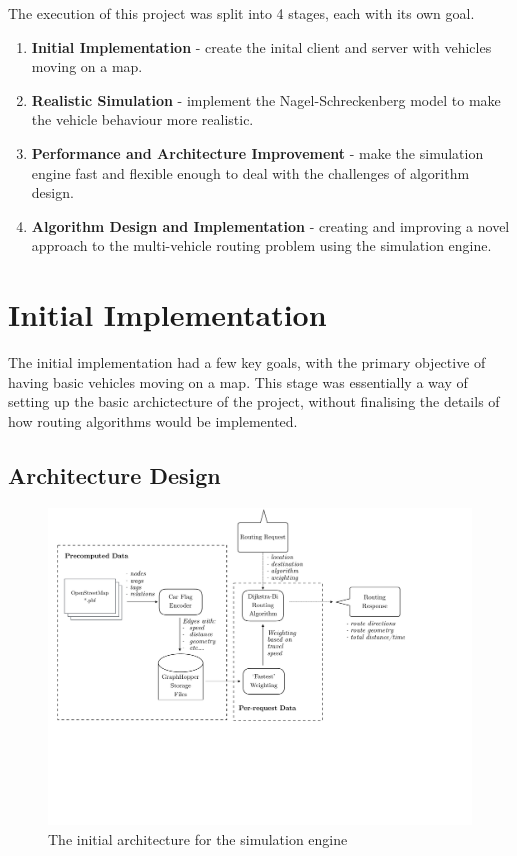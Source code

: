 \documentclass[ %
                    author={Alexander Hill},
                supervisor={Dr. Benjamin Sach},
                    degree={MEng},
                     title={MARMOSET: Multi Agent Real-time Multi-core Online
                     Simulation for Efficient Transportation},
                  subtitle={},
                      type={research},
                      year={2016} ]{dissertation}
\begin{document}
The execution of this project was split into 4 stages, each with its own goal.

\begin{enumerate}
    \item \textbf{Initial Implementation} - create the inital client and
        server with vehicles moving on a map.
    \item \textbf{Realistic Simulation} - implement the Nagel-Schreckenberg
        model to make the vehicle behaviour more realistic.
    \item \textbf{Performance and Architecture Improvement} - make the
        simulation engine fast and flexible enough to deal with the challenges
        of algorithm design.
    \item \textbf{Algorithm Design and Implementation} - creating and improving
        a novel approach to the multi-vehicle routing problem using the
        simulation engine.
\end{enumerate}

\section{Initial Implementation}

The initial implementation had a few key goals, with the primary objective of
having basic vehicles moving on a map. This stage was essentially a way of
setting up the basic archictecture of the project, without finalising the
details of how routing algorithms would be implemented.

\subsection{Architecture Design}

\begin{figure}[h]
    \centering
    \includegraphics[scale=0.5,page=2,clip,trim=0 17cm 3cm 0]{architecture}
    \caption{The initial architecture for the simulation engine}\label{fig:init-arch}
\end{figure}
\end{document}
